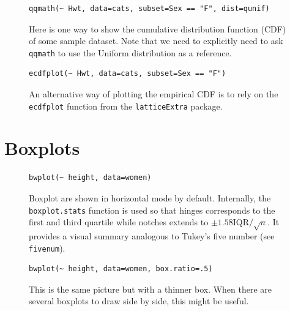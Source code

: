\documentclass[a4paper,twoside]{book}
\newcounter{fig}
\newcommand{\img}[1]{\texttt{[image: \#1]}\stepcounter{fig}}
\renewcommand{\texttt}[1]{\lstinline{#1}}
\begin{document}
\begin{figure}[H]
\begin{lstlisting}
qqmath(~ Hwt, data=cats, subset=Sex == "F", dist=qunif)
\end{lstlisting}
  \fcapside[\FBwidth] {\img{figs_lattice-crop}}
  {\caption*{
      Here is one way to show the cumulative distribution function
      (CDF) of some sample dataset. Note that we need to explicitly
      need to ask \texttt{qqmath} to use the Uniform distribution as a
      reference.}}
\end{figure}

\begin{figure}[H]
\begin{lstlisting}
ecdfplot(~ Hwt, data=cats, subset=Sex == "F")
\end{lstlisting}
  \fcapside[\FBwidth] {\img{figs_lattice-crop}}
  {\caption*{An alternative way of plotting the empirical CDF is to
      rely on the \texttt{ecdfplot} function from the
      \texttt{latticeExtra} package.}}
\end{figure}


\section{Boxplots}\label{sec:boxplot}
\lipsum[1]

\begin{figure}[H]
\begin{lstlisting}
bwplot(~ height, data=women)
\end{lstlisting}
  \fcapside[\FBwidth] {\img{figs_lattice-crop}}
  {\caption*{
      Boxplot are shown in horizontal mode by default. Internally, the
      \texttt{boxplot.stats} function is used so that hinges
      corresponds to the first and third quartile while notches
      extends to $\pm 1.58\textrm{IQR}/\sqrt{n}$. It provides a visual
      summary analogous to Tukey's five number (see
      \texttt{fivenum}).}}
\end{figure}

\begin{figure}[H]
\begin{lstlisting}
bwplot(~ height, data=women, box.ratio=.5)
\end{lstlisting}
  \fcapside[\FBwidth] {\img{figs_lattice-crop}} {\caption*{This is the
      same picture but with a thinner box. When there are several
      boxplots to draw side by side, this might be useful.}}
\end{figure}
\end{document}
